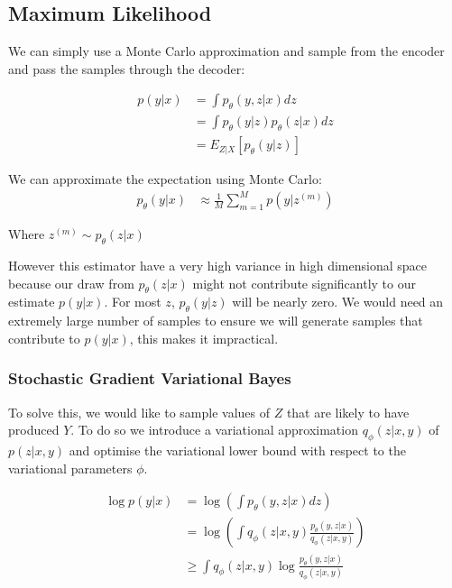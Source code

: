 \documentclass[10pt,oneside,openright]{report}
\begin{document}
\begin{figure}[H]
\centering
{}
\end{figure}

\subsection{Maximum Likelihood}

We can simply use a Monte Carlo approximation and sample from the encoder and pass the samples through the decoder:

\begin{align}
 p(y|x) &= \int p_\theta(y, z|x) dz \\
 &= \int p_\theta(y|z) p_\theta(z|x) dz \\
 &= E_{Z | X}[p_\theta(y|z)] 
\end{align}

We can approximate the expectation using Monte Carlo:
\begin{align}
 p_\theta(y|x) &\approx \frac{1}{M} \sum^M_{m=1} p(y | z^{(m)}) 
\end{align}

Where $ z^{(m)} \sim p_\theta(z|x) $

However this estimator have a very high variance in high dimensional space because our draw from $p_\theta(z | x)$ might not contribute significantly to our estimate $p(y |x)$. For most $z$, $p_\theta(y|z)$ will be nearly zero. We would need an extremely large number of samples to ensure we will generate samples that contribute to $p(y|x)$, this makes it impractical.

\subsubsection{Stochastic Gradient Variational Bayes}

To solve this, we would like to sample values of $Z$ that are likely to have produced $Y$. To do so we introduce a variational approximation $q_\phi(z|x, y)$ of $p(z|x, y)$ and optimise the variational lower bound with respect to the variational parameters $\phi$.
 
\begin{align}
 \log p(y|x) &= \log(\int p_\theta(y, z|x) dz) \\
 & =  \log(\int q_\phi(z|x, y) \frac{p_\theta(y, z|x)}{q_\phi(z|x, y)}) \\
 & \geq \int q_\phi(z|x, y) \log \frac{p_\theta(y, z|x)}{q_\phi(z|x, y)}
\end{align}
\end{document}
